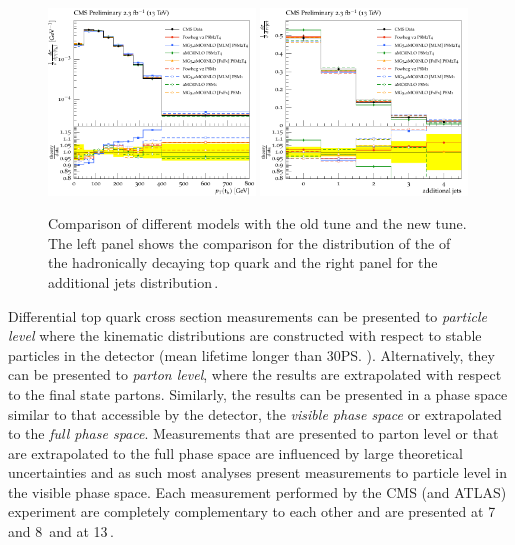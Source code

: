 \begin{figure}[htpb]
	\centering
	\includegraphics[width=0.49\textwidth]{Figures/TuningEx3}
	\includegraphics[width=0.49\textwidth]{Figures/TuningEx2}
	\caption[Comparison of different \ttbar{} models with the old \CUETold{} tune and the new \CUET{} tune. The left panel shows the comparison for the distribution of the \pt{} of the hadronically decaying top quark and the right panel for the additional jets distribution.]{ Comparison of different \ttbar{} models with the old \CUETold{} tune and the new \CUET{} tune. The left panel shows the comparison for the distribution of the \pt{} of the hadronically decaying top quark and the right panel for the additional jets distribution\,\cite{TOP16021}. }
	\label{fig:8TeVTuning}
\end{figure}

Differential top quark cross section measurements can be presented to \textit{particle level} where the kinematic distributions are constructed with respect to stable particles in the detector (mean lifetime longer than 30\ps{}).
Alternatively, they can be presented to \textit{parton level}, where the results are extrapolated with respect to the final state partons.
Similarly, the results can be presented in a phase space similar to that accessible by the detector, the \textit{visible phase space} or extrapolated to the \textit{full phase space}.
Measurements that are presented to parton level or that are extrapolated to the full phase space are influenced by large theoretical uncertainties and as such most analyses present measurements to particle level in the visible phase space.
Each measurement performed by the CMS (and ATLAS) experiment are completely complementary to each other and are presented at 7 and 8\TeV{}\,\cite{TOP11013,TOP12028,TOP14012,TOP14013} and at 13\TeV\,\cite{TOP16007,TOP16008,TOP16010,TOP17002}.

